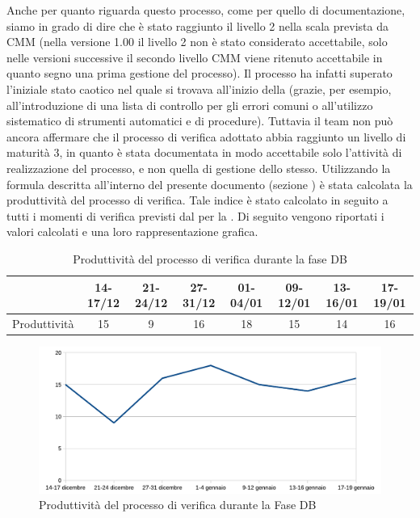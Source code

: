 				Anche per quanto riguarda questo processo, come per quello di documentazione, siamo in grado di dire che è stato raggiunto il livello 2 
				nella scala prevista da CMM (nella versione 1.00 il livello 2 non è stato considerato accettabile, solo nelle versioni successive il secondo livello CMM viene ritenuto accettabile in quanto segno una prima gestione del processo). Il processo ha infatti superato l'iniziale stato caotico nel quale si trovava all'inizio della 
				(grazie, per esempio, all'introduzione di una lista di controllo per gli errori comuni o all'utilizzo sistematico di strumenti 
				automatici e di procedure). Tuttavia il team non può ancora affermare che il processo di verifica adottato abbia raggiunto un livello di 
				maturità 3, in quanto è stata documentata in modo accettabile solo l'attività di realizzazione del processo, e non quella di gestione 
				dello stesso.
				Utilizzando la formula descritta all'interno del presente documento (sezione ) è stata calcolata la produttività del 
				processo di verifica. Tale indice è stato calcolato in seguito a tutti i momenti di verifica previsti dal  per 
				la . Di seguito vengono riportati i valori calcolati e una loro rappresentazione grafica.
				\begin{table}[H]
					\centering
						\begin{tabu}{| l | c | c | c | c | c | c | c |}
							\hline
								&14-17/12	&21-24/12	&27-31/12 	&01-04/01	&09-12/01	&13-16/01	&17-19/01	\\ \hline
							Produttività	&15	&9	&16	&18	&15	&14	&16\\ \hline
						\end{tabu}
					\caption{Produttività del processo di verifica durante la fase DB}
				\end{table}
				\begin{figure}[H]
					\centering
					\includegraphics[width=12cm]{PianoDiQualifica/Pics/ProduttivitaVerificaFaseDB.pdf}
					\caption{Produttività del processo di verifica durante la Fase DB}
				\end{figure}
